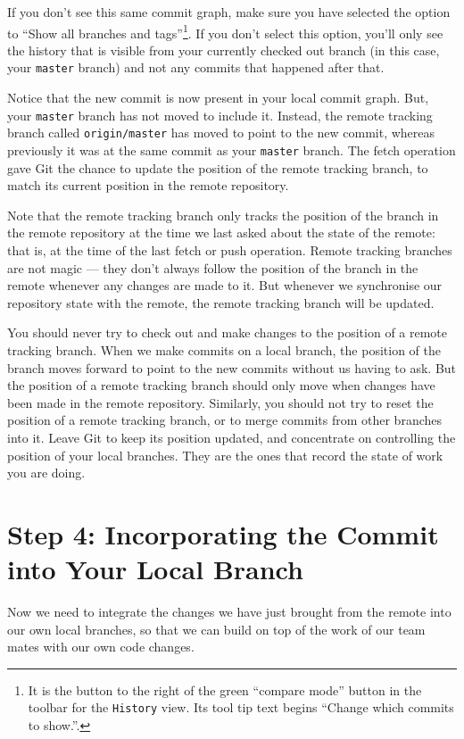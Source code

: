 \documentclass[
]{book}
\begin{document}
If you don't see this same commit graph, make sure you have selected the option to ``Show all branches and tags''\footnote{It is the button to the right of the green ``compare mode'' button in the toolbar for the \texttt{History} view. Its tool tip text begins ``Change which commits to show.''.}. If you don't select this option, you'll only see the history that is visible from your currently checked out branch (in this case, your \texttt{master} branch) and not any commits that happened after that.

Notice that the new commit is now present in your local commit graph. But, your \texttt{master} branch has not moved to include it. Instead, the remote tracking branch called \texttt{origin/master} has moved to point to the new commit, whereas previously it was at the same commit as your \texttt{master} branch. The fetch operation gave Git the chance to update the position of the remote tracking branch, to match its current position in the remote repository.

Note that the remote tracking branch only tracks the position of the branch in the remote repository at the time we last asked about the state of the remote: that is, at the time of the last fetch or push operation. Remote tracking branches are not magic --- they don't always follow the position of the branch in the remote whenever any changes are made to it. But whenever we synchronise our repository state with the remote, the remote tracking branch will be updated.

You should never try to check out and make changes to the position of a remote tracking branch. When we make commits on a local branch, the position of the branch moves forward to point to the new commits without us having to ask. But the position of a remote tracking branch should only move when changes have been made in the remote repository. Similarly, you should not try to reset the position of a remote tracking branch, or to merge commits from other branches into it. Leave Git to keep its position updated, and concentrate on controlling the position of your local branches. They are the ones that record the state of work you are doing.

\hypertarget{inc}{%
\section{Step 4: Incorporating the Commit into Your Local Branch}\label{inc}}

Now we need to integrate the changes we have just brought from the remote into our own local branches, so that we can build on top of the work of our team mates with our own code changes.
\end{document}
